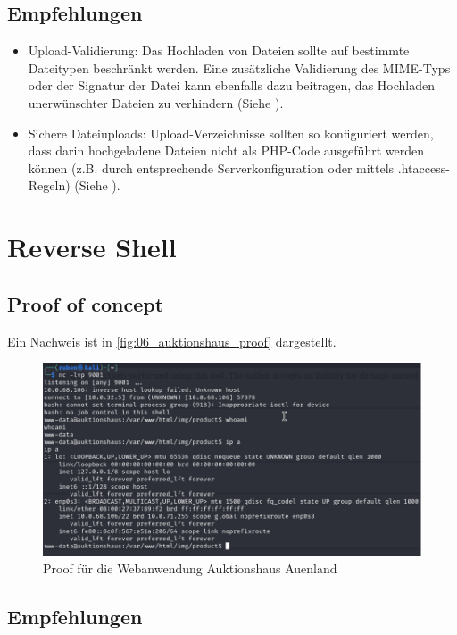 \subsection*{Empfehlungen}
\begin{itemize}
    \item Upload-Validierung: Das Hochladen von Dateien sollte auf bestimmte Dateitypen beschränkt werden. Eine zusätzliche Validierung des MIME-Typs oder der Signatur der Datei kann ebenfalls dazu beitragen, das Hochladen unerwünschter Dateien zu verhindern (Siehe \cite{owaspFileUpload}).
    \item Sichere Dateiuploads: Upload-Verzeichnisse sollten so konfiguriert werden, dass darin hochgeladene Dateien nicht als PHP-Code ausgeführt werden können (z.B. durch entsprechende Serverkonfiguration oder mittels .htaccess-Regeln) (Siehe \cite{owaspFileUpload}).
\end{itemize}


\section{\makecvssbadge Reverse Shell}

\subsection*{Proof of concept}

Ein Nachweis ist in \autoref{fig:06_auktionshaus_proof} dargestellt.
\begin{figure}[!ht]
    \centering
    \includegraphics[width=\linewidth]{images/proofs/06_auktionshaus_proof.png}
    \caption{Proof für die Webanwendung Auktionshaus Auenland}
    \label{fig:06_auktionshaus_proof}
\end{figure}

\subsection*{Empfehlungen}